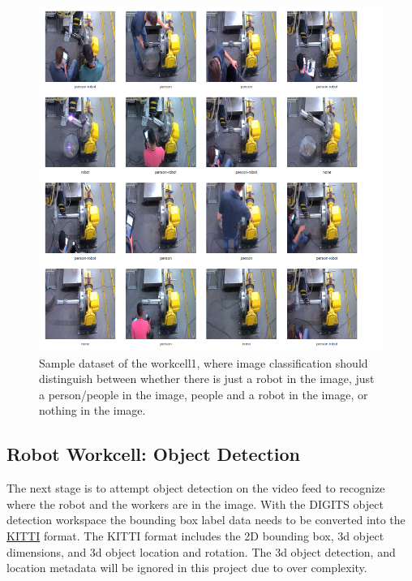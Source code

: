 \documentclass[10pt,journal,compsoc]{IEEEtran}
\begin{document}
\begin{figure}[thpb]
  \centering
  \includegraphics[width=\linewidth]{../img/Workcell1-Classification/dataset/WC1-labels.png}
  \caption{Sample dataset of the workcell1, where image classification should distinguish between whether there is just a robot in the image, just a person/people in the image, people and a robot in the image, or nothing in the image.}
  \label{workcell1Data}
\end{figure}

\subsection{Robot Workcell: Object Detection}

The next stage is to attempt object detection on the video feed to recognize where the robot and the workers are in the image. With the DIGITS object detection workspace the bounding box label data needs to be converted into the \href{http://www.cvlibs.net/datasets/kitti/}{KITTI} format. The KITTI format includes the 2D bounding box, 3d object dimensions, and 3d object location and rotation. The 3d object detection, and location metadata will be ignored in this project due to over complexity.
\end{document}
